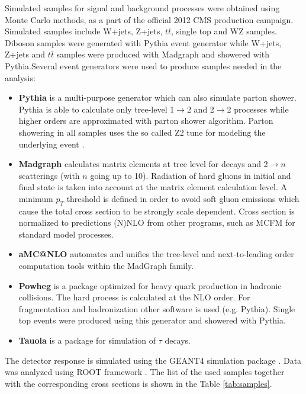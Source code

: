 \par Simulated samples for signal and background processes were obtained using Monte Carlo methods, as a part of the official 2012 CMS production campaign. Simulated samples include W+jets, Z+jets, $t\bar{t}$, single top and WZ samples. Diboson samples were generated with Pythia event generator while W+jets, Z+jets and $t\bar{t}$ samples were produced with Madgraph and showered with Pythia.Several event generators were used to produce samples needed in the analysis:
\begin{itemize}
\item \textbf{Pythia} \cite{Sjostrand:2006za,Sjostrand:2007gs} is a multi-purpose generator which can also simulate parton shower. Pythia is able to calculate only tree-level 1$\rightarrow$2 and 2$\rightarrow$2 processes while higher orders are approximated with parton shower algorithm. Parton showering in all samples uses the so called Z2 tune for modeling the underlying event \cite{Field:2010bc,Chatrchyan:2013ala}.   
\item \textbf{Madgraph} \cite{Alwall:2011uj} calculates matrix elements at tree level for decays and 2$\rightarrow n$ scatterings (with $n$ going up to 10). Radiation of hard gluons in initial and final state is taken into account at the matrix element calculation level. A minimum $p_T$ threshold is defined in order to avoid soft gluon emissions which cause the total cross section to be strongly scale dependent. Cross section is normalized to predictions (N)NLO from other programs, such as MCFM \cite{Campbell:2010ff} for standard model processes.   
\item \textbf{aMC@NLO} \cite{Alwall:2014hca} automates and unifies the tree-level and next-to-leading order computation tools within the MadGraph family.
\item \textbf{Powheg} \cite{Oleari:2010nx} is a package optimized for heavy quark production in hadronic collisions. The hard process is calculated at the NLO order. For fragmentation and hadronization other software is used (e.g. Pythia). Single top events were produced using this generator and showered with Pythia. 
\item \textbf{Tauola} \cite{Jadach:1993hs} is a package for simulation of $\tau$ decays.
\end{itemize}
        
The detector response is simulated using the GEANT4 simulation package \cite{Agostinelli:2002hh}. Data was analyzed using ROOT framework \cite{Brun:1997pa}. The list of the used samples together with the corresponding cross sections is shown in the Table \ref{tab:samples}.

